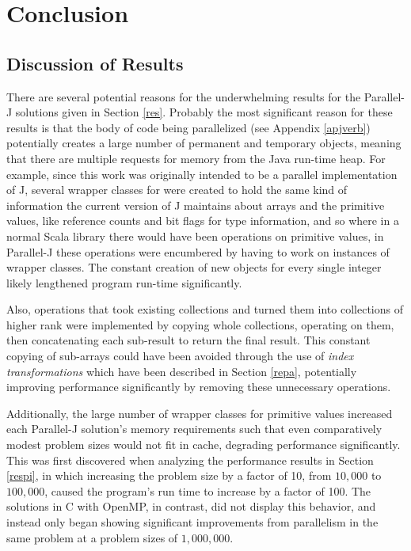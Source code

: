 \chapter{Conclusion}
\label{conc}

\section{Discussion of Results}
\label{discres}
There are several potential reasons for the underwhelming results for the Parallel-J solutions given in Section \ref{res}. 
Probably the most significant reason for these results is that the body of code being parallelized (see Appendix \ref{apjverb}) 
potentially creates a large number of permanent and temporary objects, 
meaning that there are multiple requests for memory from the Java run-time heap. 
For example, since this work was originally intended to be a parallel implementation of J, 
several wrapper classes for were created to hold the same kind of information the current version of J\cite{ioj} 
maintains about arrays and the primitive values, like reference counts and bit flags for type information, 
and so where in a normal Scala library there would have been operations on primitive values, 
in Parallel-J these operations were encumbered by having to work on instances of wrapper classes. 
The constant creation of new objects for every single integer likely lengthened program run-time significantly.

Also, operations that took existing collections and turned them into collections of higher rank 
were implemented by copying whole collections, operating on them, 
then concatenating each sub-result to return the final result. 
This constant copying of sub-arrays could have been avoided through the use of \textit{index transformations} 
which have been described in Section \ref{repa}, potentially improving performance significantly 
by removing these unnecessary operations.
 
Additionally, the large number of wrapper classes for primitive values 
increased each Parallel-J solution's memory requirements such that even comparatively modest problem sizes
would not fit in cache, degrading performance significantly. 
This was first discovered when analyzing the performance results in Section \ref{respi}, 
in which increasing the problem size by a factor of 10, from $10,000$ to $100,000$, 
caused the program's run time to increase by a factor of 100. 
The solutions in C with OpenMP, in contrast, did not display this behavior, 
and instead only began showing significant improvements from parallelism in the same problem 
at a problem sizes of $1,000,000$.

